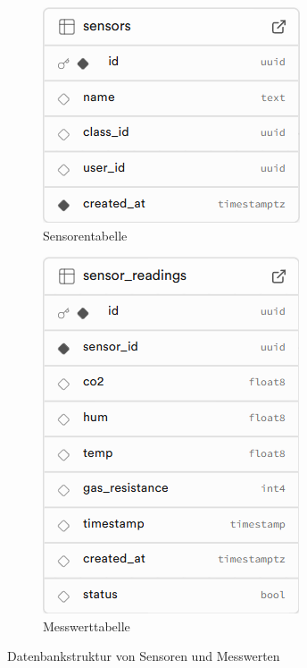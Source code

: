 \begin{inhalt}
\begin{figure}[!htb]
  \centering
  \begin{subfigure}[b]{0.45\textwidth}
    \centering
    \includegraphics[scale=0.45]{files/Thomas/pics/Datenbank_Design/sensors.png}
    \caption[Tabelle Sensors]{Sensorentabelle}
    \label{fig:sensors_tabelle}
  \end{subfigure}
  \hfill
  \begin{subfigure}[b]{0.45\textwidth}
    \centering
    \includegraphics[scale=0.45]{files/Thomas/pics/Datenbank_Design/sensor_readings.png}
    \caption[Tabelle Sensor Readings]{Messwerttabelle}
    \label{fig:sensor_readings_tabelle}
  \end{subfigure}
  \caption[Sensor- und Messwerttabellen]{Datenbankstruktur von Sensoren und Messwerten}
  \label{fig:sensors_sensor_readings}
\end{figure}

\newpage


\end{inhalt}
